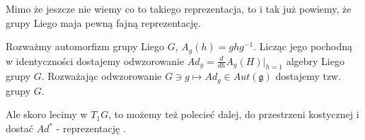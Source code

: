 Mimo że jeszcze nie wiemy co to takiego reprezentacja, to i tak już powiemy, że grupy Liego maja pewną fajną reprezentację.

\begin{example}
  Rozważmy automorfizm grupy Liego $G$, $A_g(h)=ghg^{-1}$. Licząc jego pochodną w identyczności dostajemy odwzorowanie $Ad_g=\frac{d}{dh}A_g(H)|_{h=1}$ algebry Liego grupy $G$. Rozważając odwzorowanie $G\ni g\mapsto Ad_g\in Aut(\mathfrak{g})$ dostajemy tzw.  grupy $G$.

  Ale skoro lecimy w $T_1G$, to możemy też polecieć dalej, do przestrzeni kostycznej i dostać $Ad^*$ - reprezentację .
\end{example}



